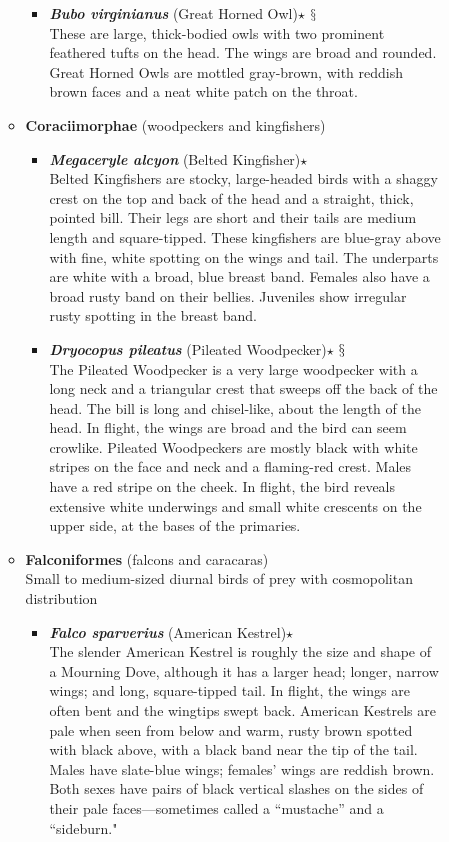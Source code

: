 \documentclass[a4paper,12pt]{article}
\begin{document}
\begin{description}
\begin{itemize}
\begin{itemize}
    \begin{itemize}
      \item{\textbf{\textit{Bubo virginianus}} (Great Horned Owl)$\star$ $\mathsection$} \\ These are large, thick-bodied owls with two prominent feathered tufts on the head. The wings are broad and rounded. Great Horned Owls are mottled gray-brown, with reddish brown faces and a neat white patch on the throat.
    \end{itemize}
    \item {\textbf{Coraciimorphae} (woodpeckers and kingfishers)}
    \begin{itemize}
      \item{\textbf{\textit{Megaceryle alcyon}} (Belted Kingfisher)$\star$} \\ Belted Kingfishers are stocky, large-headed birds with a shaggy crest on the top and back of the head and a straight, thick, pointed bill. Their legs are short and their tails are medium length and square-tipped. These kingfishers are blue-gray above with fine, white spotting on the wings and tail. The underparts are white with a broad, blue breast band. Females also have a broad rusty band on their bellies. Juveniles show irregular rusty spotting in the breast band.
      \item{\textbf{\textit{Dryocopus pileatus}} (Pileated Woodpecker)$\star$ $\mathsection$} \\ The Pileated Woodpecker is a very large woodpecker with a long neck and a triangular crest that sweeps off the back of the head. The bill is long and chisel-like, about the length of the head. In flight, the wings are broad and the bird can seem crowlike. Pileated Woodpeckers are mostly black with white stripes on the face and neck and a flaming-red crest. Males have a red stripe on the cheek. In flight, the bird reveals extensive white underwings and small white crescents on the upper side, at the bases of the primaries.
    \end{itemize}
    \item {\textbf{Falconiformes} (falcons and caracaras)} \\ Small to medium-sized diurnal birds of prey with cosmopolitan distribution
    \begin{itemize}
      \item{\textbf{\textit{Falco sparverius}} (American Kestrel)$\star$} \\ The slender American Kestrel is roughly the size and shape of a Mourning Dove, although it has a larger head; longer, narrow wings; and long, square-tipped tail. In flight, the wings are often bent and the wingtips swept back. American Kestrels are pale when seen from below and warm, rusty brown spotted with black above, with a black band near the tip of the tail. Males have slate-blue wings; females’ wings are reddish brown. Both sexes have pairs of black vertical slashes on the sides of their pale faces—sometimes called a “mustache” and a “sideburn."

\end{itemize}
\end{itemize}
\end{itemize}
\end{description}
\end{document}
